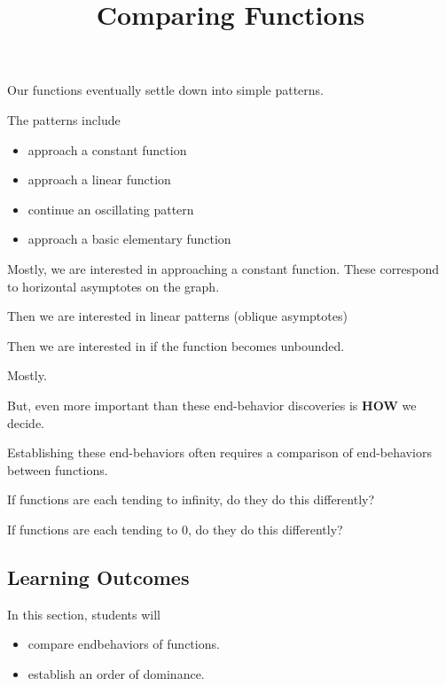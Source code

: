 \documentclass{ximera}
\title{Comparing Functions}
\begin{document}
\begin{abstract}
\end{abstract}
\maketitle







Our functions eventually settle down into simple patterns.  

The patterns include

\begin{itemize}
\item approach a constant function
\item approach a linear function
\item continue an oscillating pattern
\item approach a basic elementary function 
\end{itemize}


Mostly, we are interested in approaching a constant function.  These correspond to horizontal asymptotes on the graph.

Then we are interested in linear patterns (oblique asymptotes)

Then we are interested in if the function becomes unbounded.

Mostly.


But, even more important than these end-behavior discoveries is \textbf{HOW} we decide.

Establishing these end-behaviors often requires a comparison of end-behaviors between functions.  


If functions are each tending to infinity, do they do this differently?


If functions are each tending to $0$, do they do this differently?















\subsection{Learning Outcomes}


\begin{sectionOutcomes}
In this section, students will 

\begin{itemize}
\item compare endbehaviors of functions.
\item establish an order of dominance.
\end{itemize}
\end{sectionOutcomes}
\end{document}
